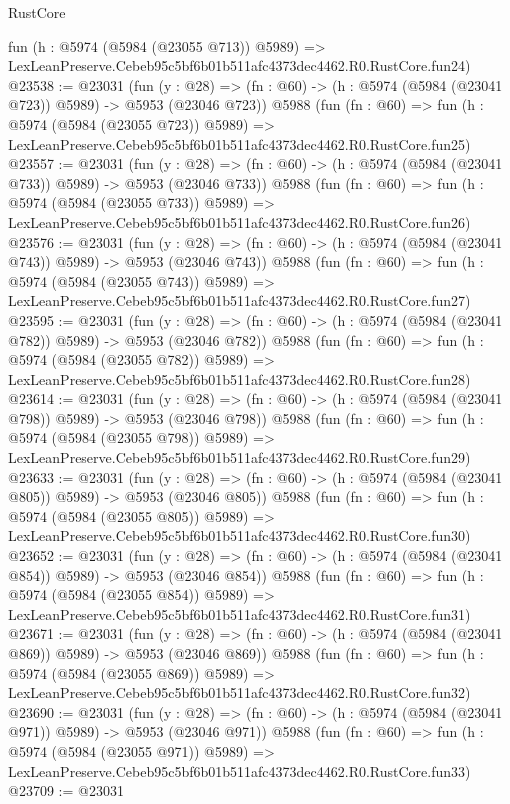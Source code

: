 \begin{lexlean}{RustCore}
\begin{coremodule}
    fun (h : @5974 (@5984 (@23055 @713)) @5989) =>
    LexLeanPreserve.Cebeb95c5bf6b01b511afc4373dec4462.R0.RustCore.fun24)
@23538 := @23031
    (fun (y : @28) => (fn : @60) -> (h : @5974 (@5984 (@23041 @723)) @5989) -> @5953 (@23046 @723))
    @5988
    (fun (fn : @60) =>
    fun (h : @5974 (@5984 (@23055 @723)) @5989) =>
    LexLeanPreserve.Cebeb95c5bf6b01b511afc4373dec4462.R0.RustCore.fun25)
@23557 := @23031
    (fun (y : @28) => (fn : @60) -> (h : @5974 (@5984 (@23041 @733)) @5989) -> @5953 (@23046 @733))
    @5988
    (fun (fn : @60) =>
    fun (h : @5974 (@5984 (@23055 @733)) @5989) =>
    LexLeanPreserve.Cebeb95c5bf6b01b511afc4373dec4462.R0.RustCore.fun26)
@23576 := @23031
    (fun (y : @28) => (fn : @60) -> (h : @5974 (@5984 (@23041 @743)) @5989) -> @5953 (@23046 @743))
    @5988
    (fun (fn : @60) =>
    fun (h : @5974 (@5984 (@23055 @743)) @5989) =>
    LexLeanPreserve.Cebeb95c5bf6b01b511afc4373dec4462.R0.RustCore.fun27)
@23595 := @23031
    (fun (y : @28) => (fn : @60) -> (h : @5974 (@5984 (@23041 @782)) @5989) -> @5953 (@23046 @782))
    @5988
    (fun (fn : @60) =>
    fun (h : @5974 (@5984 (@23055 @782)) @5989) =>
    LexLeanPreserve.Cebeb95c5bf6b01b511afc4373dec4462.R0.RustCore.fun28)
@23614 := @23031
    (fun (y : @28) => (fn : @60) -> (h : @5974 (@5984 (@23041 @798)) @5989) -> @5953 (@23046 @798))
    @5988
    (fun (fn : @60) =>
    fun (h : @5974 (@5984 (@23055 @798)) @5989) =>
    LexLeanPreserve.Cebeb95c5bf6b01b511afc4373dec4462.R0.RustCore.fun29)
@23633 := @23031
    (fun (y : @28) => (fn : @60) -> (h : @5974 (@5984 (@23041 @805)) @5989) -> @5953 (@23046 @805))
    @5988
    (fun (fn : @60) =>
    fun (h : @5974 (@5984 (@23055 @805)) @5989) =>
    LexLeanPreserve.Cebeb95c5bf6b01b511afc4373dec4462.R0.RustCore.fun30)
@23652 := @23031
    (fun (y : @28) => (fn : @60) -> (h : @5974 (@5984 (@23041 @854)) @5989) -> @5953 (@23046 @854))
    @5988
    (fun (fn : @60) =>
    fun (h : @5974 (@5984 (@23055 @854)) @5989) =>
    LexLeanPreserve.Cebeb95c5bf6b01b511afc4373dec4462.R0.RustCore.fun31)
@23671 := @23031
    (fun (y : @28) => (fn : @60) -> (h : @5974 (@5984 (@23041 @869)) @5989) -> @5953 (@23046 @869))
    @5988
    (fun (fn : @60) =>
    fun (h : @5974 (@5984 (@23055 @869)) @5989) =>
    LexLeanPreserve.Cebeb95c5bf6b01b511afc4373dec4462.R0.RustCore.fun32)
@23690 := @23031
    (fun (y : @28) => (fn : @60) -> (h : @5974 (@5984 (@23041 @971)) @5989) -> @5953 (@23046 @971))
    @5988
    (fun (fn : @60) =>
    fun (h : @5974 (@5984 (@23055 @971)) @5989) =>
    LexLeanPreserve.Cebeb95c5bf6b01b511afc4373dec4462.R0.RustCore.fun33)
@23709 := @23031

\end{coremodule}
\end{lexlean}
